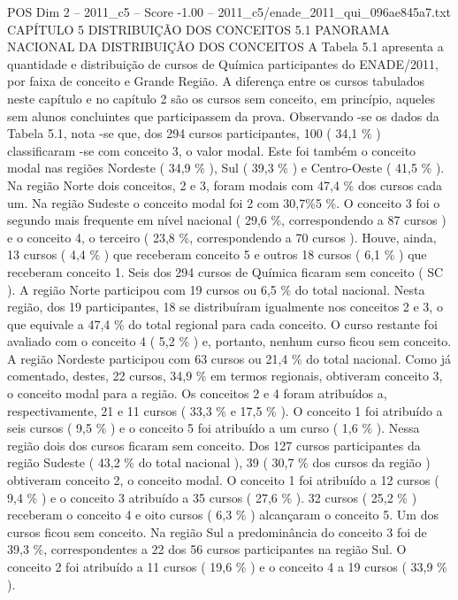 \begin{textsample}{POS Dim 2 – 2011\_c5 – Score -1.00 – 2011\_c5/enade\_2011\_qui\_096ae845a7.txt}  \label{ex:f2_pos_352}
CAPÍTULO 5 DISTRIBUIÇÃO DOS CONCEITOS 5.1 PANORAMA NACIONAL DA DISTRIBUIÇÃO DOS CONCEITOS A Tabela 5.1 apresenta a quantidade e distribuição de cursos de Química participantes do ENADE/2011, por faixa de conceito e Grande Região.
A diferença entre os cursos tabulados neste capítulo e no capítulo 2 são os cursos sem conceito, em princípio, aqueles sem alunos concluintes que participassem da prova.
Observando -se os dados da Tabela 5.1, nota -se que, dos 294 cursos participantes, 100 ( 34,1 \% ) classificaram -se com conceito 3, o valor modal.
Este foi também o conceito modal nas regiões Nordeste ( 34,9 \% ), Sul ( 39,3 \% ) e Centro-Oeste ( 41,5 \% ).
Na região Norte dois conceitos, 2 e 3, foram modais com 47,4 \% dos cursos cada um.
Na região Sudeste o conceito modal foi 2 com 30,7\%5 \%.
O conceito 3 foi o segundo mais frequente em nível nacional ( 29,6 \%, correspondendo a 87 cursos ) e o conceito 4, o terceiro ( 23,8 \%, correspondendo a 70 cursos ).
Houve, ainda, 13 cursos ( 4,4 \% ) que receberam conceito 5 e outros 18 cursos ( 6,1 \% ) que receberam conceito 1.
Seis dos 294 cursos de Química ficaram sem conceito ( SC ).
A região Norte participou com 19 cursos ou 6,5 \% do total nacional.
Nesta região, dos 19 participantes, 18 se distribuíram igualmente nos conceitos 2 e 3, o que equivale a 47,4 \% do total regional para cada conceito.
O curso restante foi avaliado com o conceito 4 ( 5,2 \% ) e, portanto, nenhum curso ficou sem conceito.
A região Nordeste participou com 63 cursos ou 21,4 \% do total nacional.
Como já comentado, destes, 22 cursos, 34,9 \% em termos regionais, obtiveram conceito 3, o conceito modal para a região.
Os conceitos 2 e 4 foram atribuídos a, respectivamente, 21 e 11 cursos ( 33,3 \% e 17,5 \% ).
O conceito 1 foi atribuído a seis cursos ( 9,5 \% ) e o conceito 5 foi atribuído a um curso ( 1,6 \% ).
Nessa região dois dos cursos ficaram sem conceito.
Dos 127 cursos participantes da região Sudeste ( 43,2 \% do total nacional ), 39 ( 30,7 \% dos cursos da região ) obtiveram conceito 2, o conceito modal.
O conceito 1 foi atribuído a 12 cursos ( 9,4 \% ) e o conceito 3 atribuído a 35 cursos ( 27,6 \% ). 32 cursos ( 25,2 \% ) receberam o conceito 4 e oito cursos ( 6,3 \% ) alcançaram o conceito 5.
Um dos cursos ficou sem conceito.
Na região Sul a predominância do conceito 3 foi de 39,3 \%, correspondentes a 22 dos 56 cursos participantes na região Sul.
O conceito 2 foi atribuído a 11 cursos ( 19,6 \% ) e o conceito 4 a 19 cursos ( 33,9 \% ).

\end{textsample}
